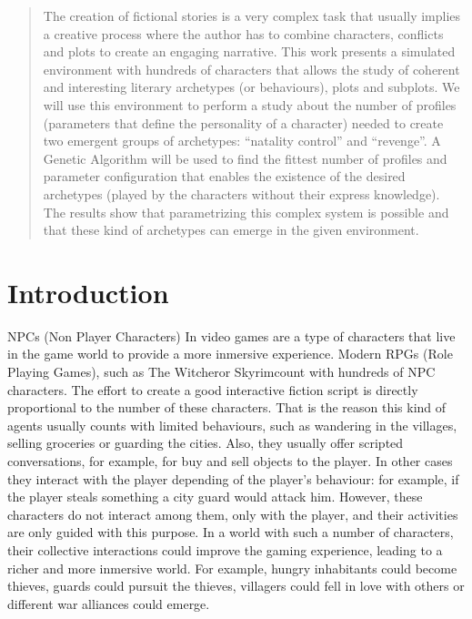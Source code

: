 \documentclass[runningheads]{llncs}
\begin{document}
\begin{abstract}


The creation of fictional stories is a very complex task that usually
implies a creative process where the author has to combine characters,
conflicts and plots to create an engaging narrative. This work
presents a simulated environment with hundreds of characters that
allows the study of coherent and interesting literary archetypes (or
behaviours), plots and subplots. We will use this environment to
perform a study about the number of profiles (parameters that define
the personality of a character) needed to create two emergent groups
of archetypes: ``natality control'' and ``revenge''. A Genetic Algorithm
will be used to find the fittest number of profiles and parameter
configuration that enables the existence of the desired archetypes
(played by the characters without their express knowledge). The
results show that parametrizing this complex system is possible and
that these kind of archetypes can emerge in the given environment. 

\end{abstract}




\section{Introduction}
\noindent 

NPCs (Non Player Characters) In video games are a type of characters that live in the game world to provide a more inmersive experience. Modern RPGs (Role Playing Games), such as The Witcher\texttrademark or Skyrim\texttrademark count with hundreds of NPC characters. The effort to create a good interactive fiction script is directly proportional to the number of these characters. That is the reason this kind of agents usually counts with limited behaviours, such as wandering in the villages, selling groceries or guarding the cities. Also, they usually offer scripted conversations, for example, for buy and sell objects to the player. In other cases they interact with the player depending of the player's behaviour: for example, if the player steals something a city guard would attack him.  However, these characters do not interact among them, only with the player, and their activities are only guided with this purpose. In a world with such a number of characters, their collective interactions could improve the gaming experience, leading to a richer and more inmersive world. For example, hungry inhabitants could become thieves, guards could pursuit the thieves, villagers could fell in love with others or different war alliances could emerge.
\end{document}

